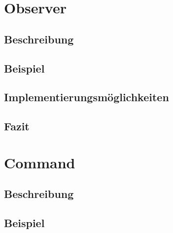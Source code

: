 \documentclass[a4paper,11pt]{scrartcl}
\begin{document}
%


%

\section{Observer}

\subsection{Beschreibung}

\subsection{Beispiel}

\subsection{Implementierungsmöglichkeiten}

\subsection{Fazit}


\section{Command}

\subsection{Beschreibung}

\subsection{Beispiel}

\end{document}
